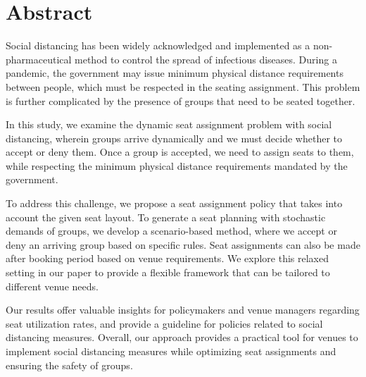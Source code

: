 
\section*{Abstract}

Social distancing has been widely acknowledged and implemented as a non-pharmaceutical method to control the spread of infectious diseases. During a pandemic, the government may issue minimum physical distance requirements between people, which must be respected in the seating assignment. This problem is further complicated by the presence of groups that need to be seated together.

In this study, we examine the dynamic seat assignment problem with social distancing, wherein groups arrive dynamically and we must decide whether to accept or deny them. Once a group is accepted, we need to assign seats to them, while respecting the minimum physical distance requirements mandated by the government.

To address this challenge, we propose a seat assignment policy that takes into account the given seat layout. To generate a seat planning with stochastic demands of groups, we develop a scenario-based method, where we accept or deny an arriving group based on specific rules. Seat assignments can also be made after booking period based on venue requirements. We explore this relaxed setting in our paper to provide a flexible framework that can be tailored to different venue needs.




Our results offer valuable insights for policymakers and venue managers regarding seat utilization rates, and provide a guideline for policies related to social distancing measures. Overall, our approach provides a practical tool for venues to implement social distancing measures while optimizing seat assignments and ensuring the safety of groups.

